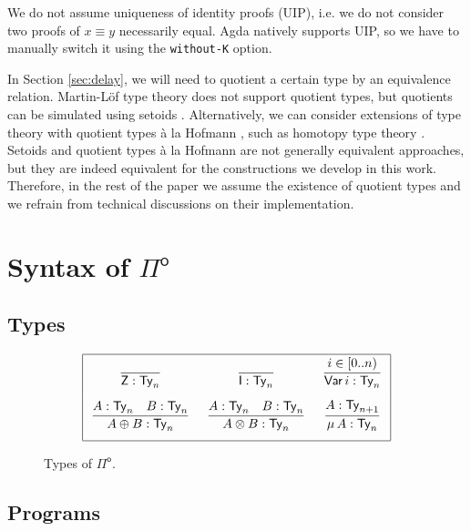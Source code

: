 \documentclass[runningheads]{llncs}
\newcommand{\Pio}{$\mathsf{\Pi}^{\mathsf{o}}$}
\newcommand{\Ty}{\mathsf{Ty}}
\newcommand{\Var}{\mathsf{Var}}
\newcommand{\Z}{\mathsf{Z}}
\newcommand{\I}{\mathsf{I}}
\begin{document}
We do not assume uniqueness of identity proofs
(UIP), i.e. we do not consider two proofs of $x \equiv y$ necessarily
equal. Agda natively supports UIP, so we have to manually switch it
using the \verb|without-K| option.

In Section \ref{sec:delay}, we will need to quotient a certain type by
an equivalence relation. Martin-L\"of type theory does not support
quotient types, but quotients can be simulated using setoids
\cite{BartheCP03}. Alternatively, we can consider extensions of type theory with
quotient types \`a la Hofmann \cite{Hofmann}, such as homotopy type
theory \cite{Hott}. Setoids and quotient types \`a la
Hofmann are not generally equivalent approaches, but they are indeed
equivalent for the constructions we develop in this work. Therefore,
in the rest of the paper we assume the existence of quotient types and
we refrain from technical discussions on their implementation.


\section{Syntax of \Pio}\label{sec:syntax}

\subsection{Types}

\begin{figure}
\[
\arraycolsep=8pt\def\arraystretch{2.8}
\begin{array}{|ccc|}
\hline 
\infer{\Z : \Ty_n}{} 
& \infer{\I : \Ty_n}{}
& \infer{\Var\,i : \Ty_n}{i \in [0..n)}  \\
\infer{A \oplus B : \Ty_n}{A : \Ty_n & B : \Ty_n}
& \infer{A \otimes B : \Ty_n}{A : \Ty_n & B : \Ty_n}
& \infer{\mu\,A : \Ty_n}{A : \Ty_{n+1}} \\
\hline
\end{array}
\]
\caption{Types of \Pio.}
\label{fig:types}
\end{figure}

\subsection{Programs}
\end{document}
